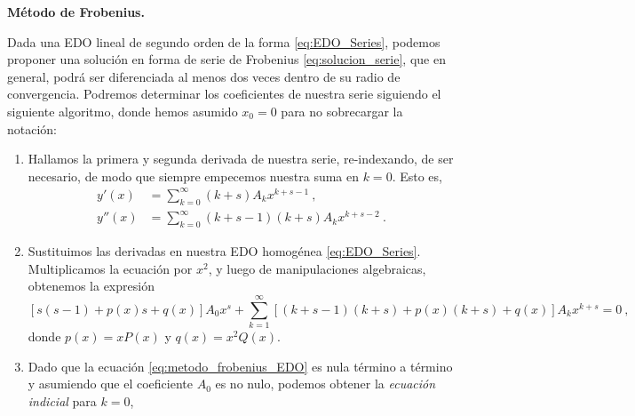 \begin{propo} 
    \textbf{Método de Frobenius.}

    Dada una EDO lineal de segundo orden de la forma \eqref{eq:EDO_Series}, podemos proponer una solución en forma de serie de Frobenius \eqref{eq:solucion_serie}, que en general, podrá ser diferenciada al menos dos veces dentro de su radio de convergencia. Podremos determinar los coeficientes de nuestra serie siguiendo el siguiente algoritmo, donde hemos asumido $x_0 = 0$ para no sobrecargar la notación:
    \begin{enumerate}
        \item Hallamos la primera y segunda derivada de nuestra serie, re-indexando, de ser necesario, de modo que siempre empecemos nuestra suma en $k=0$. Esto es,
        \begin{align}
            y'(x)  & = \sum_{k=0}^\infty (k+s) A_k x^{k+s-1} 
            \ ,
            \\
            y''(x) & = \sum_{k=0}^\infty (k+s-1)(k+s) A_k x^{k+s-2} \ .
        \end{align}
        \item Sustituimos las derivadas en nuestra EDO homogénea \eqref{eq:EDO_Series}. Multiplicamos la ecuación por $x^2$, y luego de manipulaciones algebraicas, obtenemos la expresión
        \begin{equation}\label{eq:metodo_frobenius_EDO}
            [s(s-1) + p(x)s + q(x)]A_0 x^s + \sum_{k=1}^\infty [(k+s-1)(k+s) + p(x)(k+s) + q(x)]A_k x^{k+s} = 0 \ ,
        \end{equation}
        donde $p(x) = xP(x)$ y $q(x) = x^2 Q(x)$.\footnotemark
        \item Dado que la ecuación \eqref{eq:metodo_frobenius_EDO} es nula término a término y asumiendo que el coeficiente $A_0$ es no nulo, podemos obtener la \emph{ecuación indicial} para $k=0$,
        \begin{equation} \label{eq:ecuacion_indicial}

\end{equation}
\end{enumerate}
\end{propo}
